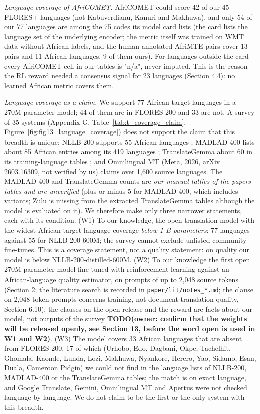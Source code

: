 \emph{Language coverage of AfriCOMET.} AfriCOMET could score 42 of our 45 FLORES+ languages (not Kabuverdianu, Kanuri and Makhuwa), and only 54 of our 77 languages are among the 75 codes its model card lists (the card lists the language set of the underlying encoder; the metric itself was trained on WMT data without African labels, and the human-annotated AfriMTE pairs cover 13 pairs and 11 African languages, 9 of them ours). For languages outside the card every AfriCOMET cell in our tables is "n/a", never imputed. This is the reason the RL reward needed a consensus signal for 23 languages (Section 4.4): no learned African metric covers them.

\emph{Language coverage as a claim.} We support 77 African target languages in a 270M-parameter model; 44 of them are in FLORES-200 and 33 are not. A survey of 35 systems (Appendix G, Table~\ref{tab:t_coverage_claim}, Figure~\ref{fig:fig13_language_coverage}) does not support the claim that this breadth is unique: NLLB-200 supports 55 African languages \citep{nllb2022nllb}; MADLAD-400 lists about 85 African entries among its 419 languages \citep{kudugunta2023madlad}; TranslateGemma about 60 in its training-language tables \citep{finkelstein2026translategemma}; and Omnilingual MT (Meta, 2026, arXiv 2603.16309, not verified by us) claims over 1,600 source languages. The MADLAD-400 and TranslateGemma counts are \emph{our manual tallies of the papers\textquotesingle{} tables and are unverified} (plus or minus 5 for MADLAD-400, which includes variants; Zulu is missing from the extracted TranslateGemma tables although the model is evaluated on it). We therefore make only three narrower statements, each with its condition. (W1) To our knowledge, the open translation model with the widest African target-language coverage \emph{below 1 B parameters}: 77 languages against 55 for NLLB-200-600M; the survey cannot exclude unlisted community fine-tunes. This is a coverage statement, not a quality statement: on quality our model is below NLLB-200-distilled-600M. (W2) To our knowledge the first open 270M-parameter model fine-tuned with reinforcement learning against an African-language quality estimator, on prompts of up to 2,048 source tokens (Section 2; the literature search is recorded in \texttt{paper/lit/notes\_*.md}; the clause on 2,048-token prompts concerns training, not document-translation quality, Section 6.10); the clauses on the open release and the reward are facts about our model, not outputs of the survey {\color{red}\textbf{TODO(owner: confirm that the weights will be released openly, see Section 13, before the word open is used in W1 and W2)}}. (W3) The model covers 33 African languages that are absent from FLORES-200, 17 of which (Urhobo, Edo, Dagbani, Okpe, Tachelhit, Ghomala, Kaonde, Lunda, Lozi, Makhuwa, Nyankore, Herero, Yao, Sidamo, Esan, Duala, Cameroon Pidgin) we could not find in the language lists of NLLB-200, MADLAD-400 or the TranslateGemma tables; the match is on exact language, and Google Translate, Gemini, Omnilingual MT and Apertus were not checked language by language. We do not claim to be the first or the only system with this breadth.

